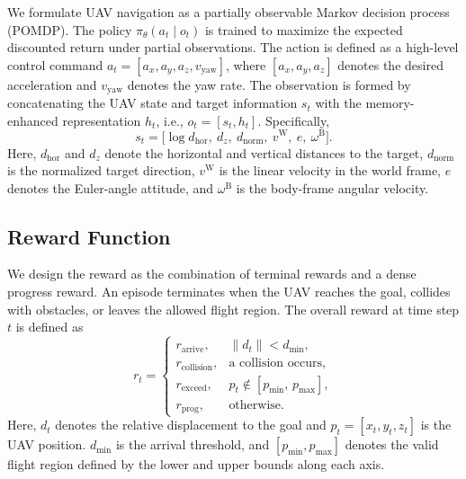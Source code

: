 \documentclass[letterpaper, 10 pt, conference]{ieeeconf}  %
\begin{document}
We formulate UAV navigation as a partially observable Markov decision process (POMDP). The policy
$\pi_\theta(a_t\mid o_t)$ is trained to maximize the expected discounted return under partial observations.
The action is defined as a high-level control command $a_t=[a_x,a_y,a_z,v_{\mathrm{yaw}}]$, where
$[a_x,a_y,a_z]$ denotes the desired acceleration and $v_{\mathrm{yaw}}$ denotes the yaw rate.
The observation is formed by concatenating the UAV state and target information $s_t$ with the
memory-enhanced representation $h_t$, i.e., $o_t=[s_t,h_t]$. Specifically,
\begin{equation}
s_t=\big[\log d_{\mathrm{hor}},\ d_z,\ d_{\mathrm{norm}},\ v^{\mathrm{W}},\ e,\ \omega^{\mathrm{B}}\big].
\end{equation}
Here, $d_{\mathrm{hor}}$ and $d_z$ denote the horizontal and vertical distances to the target,
$d_{\mathrm{norm}}$ is the normalized target direction, $v^{\mathrm{W}}$ is the linear velocity in the
world frame, $e$ denotes the Euler-angle attitude, and $\omega^{\mathrm{B}}$ is the body-frame angular velocity.


\subsection{Reward Function}
We design the reward as the combination of terminal rewards and a dense progress reward. An episode terminates when the UAV reaches the goal, collides with obstacles, or leaves the allowed flight region. The overall reward at time step $t$ is defined as
\begin{equation}
r_t=
\begin{cases}
r_{\mathrm{arrive}}, & \|d_t\|<d_{\min},\\
r_{\mathrm{collision}}, & \text{a collision occurs},\\
r_{\mathrm{exceed}}, & p_t \notin [p_{\min},\,p_{\max}],\\
r_{\mathrm{prog}}, & \text{otherwise}.
\end{cases}
\end{equation}
Here, $d_t$ denotes the relative displacement to the goal and $p_t=[x_t,y_t,z_t]$ is the UAV position. $d_{\min}$ is the arrival threshold, and $[p_{\min},p_{\max}]$ denotes the valid flight region defined by the lower and upper bounds along each axis.
\end{document}
